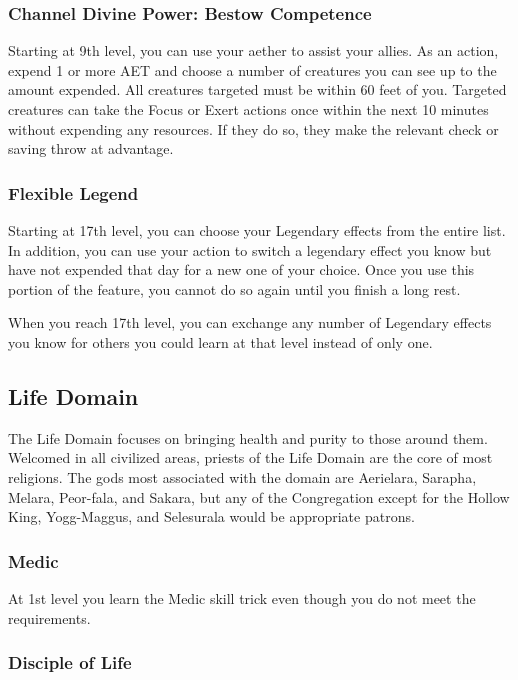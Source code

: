 \subsubsection{Channel Divine Power: Bestow Competence}
Starting at 9th level, you can use your aether to assist your allies. As an action, expend 1 or more AET and choose a number of creatures you can see up to the amount expended. All creatures targeted must be within 60 feet of you. Targeted creatures can take the Focus or Exert actions once within the next 10 minutes without expending any resources. If they do so, they make the relevant check or saving throw at advantage.

\subsubsection{Flexible Legend}
Starting at 17th level, you can choose your Legendary effects from the entire list. In addition, you can use your action to switch a legendary effect you know but have not expended that day for a new one of your choice. Once you use this portion of the feature, you cannot do so again until you finish a long rest.

When you reach 17th level, you can exchange any number of Legendary effects you know for others you could learn at that level instead of only one.

\subsection{Life Domain}

The Life Domain focuses on bringing health and purity to those around them. Welcomed in all civilized areas, priests of the Life Domain are the core of most religions. The gods most associated with the domain are Aerielara, Sarapha, Melara, Peor-fala, and Sakara, but any of the Congregation except for the Hollow King, Yogg-Maggus, and Selesurala would be appropriate patrons.

\subsubsection{Medic}
At 1st level you learn the Medic skill trick even though you do not meet the requirements.

\subsubsection{Disciple of Life}

